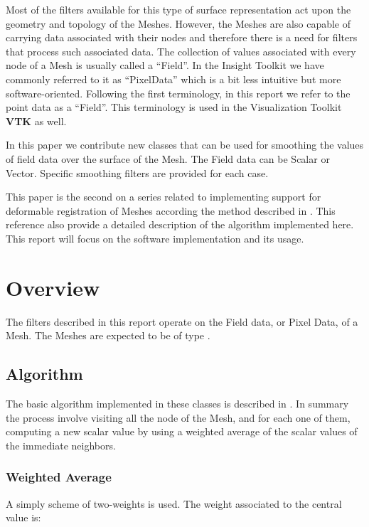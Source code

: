 \documentclass{InsightArticle}
\begin{document}
Most of the filters available for this type of surface representation act upon
the geometry and topology of the Meshes. However, the Meshes are also capable
of carrying data associated with their nodes and therefore there is a need for
filters that process such associated data. The collection of values associated
with every node of a Mesh is usually called a ``Field''. In the Insight Toolkit
we have commonly referred to it as ``PixelData'' which is a bit less intuitive
but more software-oriented.  Following the first terminology, in this report we
refer to the point data as a ``Field''. This terminology is used in the
Visualization Toolkit \textbf{VTK} as well.

In this paper we contribute new classes that can be used for smoothing the
values of field data over the surface of the Mesh. The Field data can be Scalar
or Vector. Specific smoothing filters are provided for each case.

This paper is the second on a series related to implementing support for
deformable registration of Meshes according the method described in
\cite{Yeo2008}.  This reference also provide a detailed description of the
algorithm implemented here. This report will focus on the software
implementation and its usage.

\section{Overview}

The filters described in this report operate on the Field data, or Pixel Data,
of a Mesh. The Meshes are expected to be of type .

\subsection{Algorithm}

The basic algorithm implemented in these classes is described in
\cite{Yeo2008}.  In summary the process involve visiting all the node of the
Mesh, and for each one of them, computing a new scalar value by using a
weighted average of the scalar values of the immediate neighbors.

\subsubsection{Weighted Average}

A simply scheme of two-weights is used.  The weight associated to the central
value is:
\end{document}
